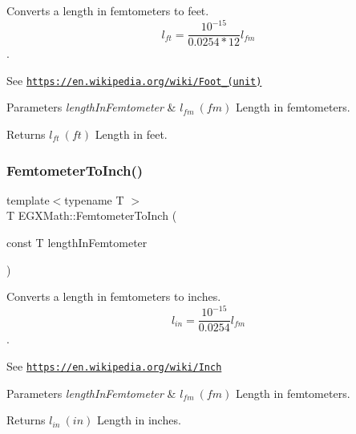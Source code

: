 Converts a length in femtometers to feet. \[ l_{ft}= \frac{10^{-15}}{0.0254 * 12} l_{fm} \]. 

See \href{https://en.wikipedia.org/wiki/Foot_(unit)}{\tt https\+://en.\+wikipedia.\+org/wiki/\+Foot\+\_\+(unit)} 
\begin{DoxyParams}{Parameters}
{\em length\+In\+Femtometer} & $ l_{fm}\ (fm)$ Length in femtometers. \\
\hline
\end{DoxyParams}
\begin{DoxyReturn}{Returns}
$ l_{ft}\ (ft)$ Length in feet. 
\end{DoxyReturn}
\mbox{\label{group___e_g_x_math-_conversions-_length_conversions-_femtometer-_imperial_ga51c3107a7cfac96232eb0b040c3192a1}} 
\subsubsection{\texorpdfstring{Femtometer\+To\+Inch()}{FemtometerToInch()}}
{\footnotesize\ttfamily template$<$typename T $>$ \\
T E\+G\+X\+Math\+::\+Femtometer\+To\+Inch (\begin{DoxyParamCaption}\item[{const T}]{length\+In\+Femtometer }\end{DoxyParamCaption})}



Converts a length in femtometers to inches. \[ l_{in}= \frac{10^{-15}}{0.0254} l_{fm} \]. 

See \href{https://en.wikipedia.org/wiki/Inch}{\tt https\+://en.\+wikipedia.\+org/wiki/\+Inch} 
\begin{DoxyParams}{Parameters}
{\em length\+In\+Femtometer} & $ l_{fm}\ (fm)$ Length in femtometers. \\
\hline
\end{DoxyParams}
\begin{DoxyReturn}{Returns}
$ l_{in}\ (in)$ Length in inches. 
\end{DoxyReturn}
\mbox{\label{group___e_g_x_math-_conversions-_length_conversions-_femtometer-_imperial_gacfcd599a1c2c834f3bbb5f3f991d55df}} 
